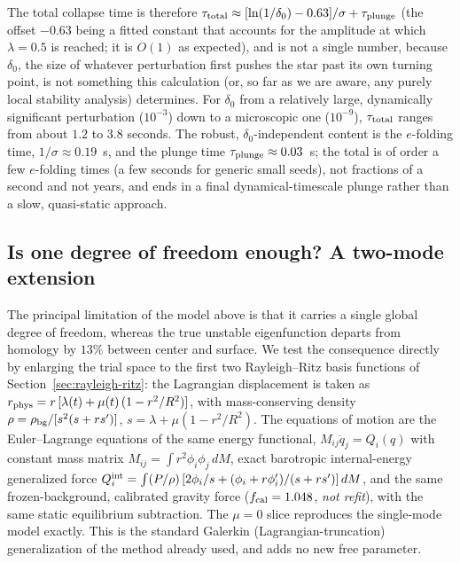 \documentclass[11pt]{article}
\begin{document}
The total collapse time is therefore $\tau_{\rm total}\approx[\ln(1/\delta_0)-0.63]/\sigma+\tau_{\rm plunge}$ (the offset $-0.63$ being a fitted constant that accounts for the amplitude at which $\lambda=0.5$ is reached; it is $O(1)$ as expected), and is not a single number, because $\delta_0$, the size of whatever perturbation first pushes the star past its own turning point, is not something this calculation (or, so far as we are aware, any purely local stability analysis) determines. For $\delta_0$ from a relatively large, dynamically significant perturbation ($10^{-3}$) down to a microscopic one ($10^{-9}$), $\tau_{\rm total}$ ranges from about $1.2$ to $3.8$ seconds. The robust, $\delta_0$-independent content is the $e$-folding time, $1/\sigma\approx0.19$~s, and the plunge time $\tau_{\rm plunge}\approx0.03$~s; the total is of order a few $e$-folding times (a few seconds for generic small seeds), not fractions of a second and not years, and ends in a final dynamical-timescale plunge rather than a slow, quasi-static approach.

\subsection{Is one degree of freedom enough? A two-mode extension}
\label{sec:twomode}

The principal limitation of the model above is that it carries a single global degree of freedom, whereas the true unstable eigenfunction departs from homology by $13\%$ between center and surface. We test the consequence directly by enlarging the trial space to the first two Rayleigh--Ritz basis functions of Section~\ref{sec:rayleigh-ritz}: the Lagrangian displacement is taken as $r_{\rm phys}=r\,[\lambda(t)+\mu(t)\,(1-r^2/R^2)]$, with mass-conserving density $\rho=\rho_{\rm bg}/[s^2(s+rs')]$, $s=\lambda+\mu(1-r^2/R^2)$. The equations of motion are the Euler--Lagrange equations of the same energy functional, $M_{ij}\ddot q_j=Q_i(q)$ with constant mass matrix $M_{ij}=\int r^2\phi_i\phi_j\,dM$, exact barotropic internal-energy generalized force $Q_i^{\rm int}=\int (P/\rho)\,[2\phi_i/s+(\phi_i+r\phi_i')/(s+rs')]\,dM$, and the same frozen-background, calibrated gravity force ($f_{\rm cal}=1.048$, \emph{not refit}), with the same static equilibrium subtraction. The $\mu=0$ slice reproduces the single-mode model exactly. This is the standard Galerkin (Lagrangian-truncation) generalization of the method already used, and adds no new free parameter.
\end{document}
